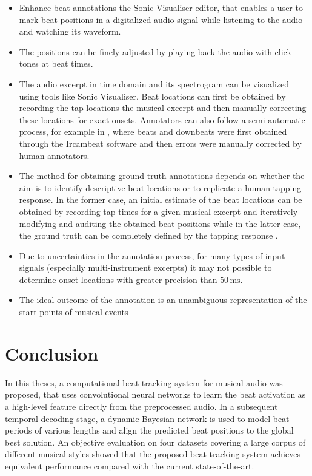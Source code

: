 \documentclass{scrartcl}
\begin{document}
\begin{itemize}
\item Enhance beat annotations the Sonic Visualiser \cite{SonicVisualiser} editor, that enables a user to mark beat positions in a digitalized audio signal while listening to the audio and watching its waveform.
\item The positions can be finely adjusted by playing back the audio with click tones at beat times.
\item The audio excerpt in time domain and its spectrogram can be visualized using tools like Sonic Visualiser. Beat locations can first be obtained by recording the tap locations the musical excerpt and then manually correcting these locations for exact onsets.  Annotators can also follow a semi-automatic process, for example in \cite{Peeters2010}, where beats and downbeats were first obtained through the Ircambeat software and then errors were manually corrected by human annotators.
\item The method for obtaining ground truth annotations depends on whether the aim is to identify descriptive beat locations or to replicate a human tapping response. In the former case, an initial estimate of the beat locations can be obtained by recording tap times for a given musical excerpt and iteratively modifying and auditing the obtained beat positions while in the latter case, the ground truth can be completely defined by the tapping response \cite{Davies2009b}.
 \item Due to uncertainties in the annotation process, for many types of input signals (especially multi-instrument excerpts) it may not possible to determine onset locations with greater precision than $50\,\text{ms}$. \cite{Leveau2004}
\item The ideal outcome of the annotation is an unambiguous representation of the start points of musical events
\end{itemize}


\newpage 

\section{Conclusion}
\label{sec:conclusion}


In this theses, a computational beat tracking system for musical audio was proposed, that uses convolutional neural networks to learn the beat activation as a high-level feature directly from the preprocessed audio. In a subsequent temporal decoding stage, a dynamic Bayesian network is used to model beat periods of various lengths and align the predicted beat positions to the global best solution. An objective evaluation on four datasets covering a large corpus of different musical styles showed that the proposed beat tracking system achieves equivalent performance compared with the current state-of-the-art.
\end{document}
